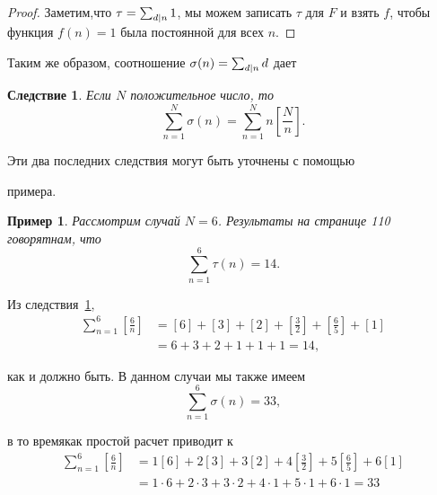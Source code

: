 \documentclass[11pt]{article}
\begin{document}
\begin{proof}
	Заметим,что $ \tau=\sum_{\tiny d|n}1 $, мы можем записать $ \tau $ для $ F $ и взять $ f $, чтобы функция $ f(n)=1 $ была постоянной для всех $ n $.
\end{proof}
Таким же образом, соотношение $\sigma(n)=\sum_{\tiny d|n}d $ дает
\newtheorem{corollary}{Следствие}
\begin{corollary} \label{corollary1}
	\textit{Если $ N $ положительное число, то}\[\sum_{n=1}^{N}\sigma(n)=\sum_{n=1}^{N}n\left[\frac{N}{n}\right].\] 
\end{corollary}
Эти два последних следствия могут быть
уточнены с помощью 

примера. 
\newtheorem{example}{Пример}
\begin{example} 
	Рассмотрим случай $ N=6 $. Результаты на странице 110 говорятнам, что \[\sum_{n=1}^{6}\tau(n)=14.\] 
\end{example}

Из следствия~\ref{corollary1},
\begin{equation*} \label{eq1}
\begin{split}
\sum_{n=1}^{6}\left[ \frac{6}{n}\right]&=\left[ 6\right] +\left[ 3\right] +\left[ 2\right] +\left[ \frac{3}{2}\right] +\left[ \frac{6}{5}\right] +\left[ 1\right]\\
&=6+3+2+1+1+1=14,
\end{split}
\end{equation*}

как и должно быть. В данном случаи мы также имеем
\[\sum_{n=1}^{6}\sigma(n)=33,\]

в то времякак простой расчет приводит к 
\begin{equation*} \label{eq2}
\begin{split}
\sum_{n=1}^{6}\left[ \frac{6}{n}\right]&=1\left[ 6\right] +2\left[ 3\right] +3\left[ 2\right] +4\left[ \frac{3}{2}\right] +5\left[ \frac{6}{5}\right] +6\left[ 1\right]\\
&=1\cdot6+2\cdot3+3\cdot2+4\cdot1+5\cdot1+6\cdot1=33
\end{split}
\end{equation*}
\end{document}
